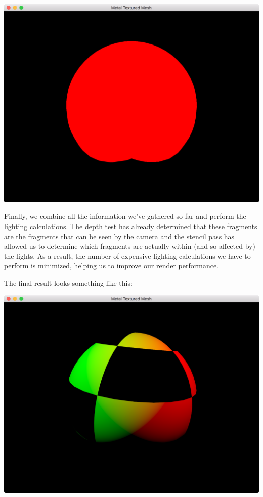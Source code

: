 \documentclass[11pt]{article}
\begin{document}
\begin{center}
\includegraphics[width=.9\linewidth]{../img/posts/implementing-deferred-shading-in-metal/stencil-buffer.png}
\end{center}

Finally, we combine all the information we've gathered so far and perform the
lighting calculations. The depth test has already determined that these
fragments are the fragments that can be seen by the camera and the stencil pass
has allowed us to determine which fragments are actually within (and so affected
by) the lights. As a result, the number of expensive lighting calculations we
have to perform is minimized, helping us to improve our render performance.

The final result looks something like this:


\begin{center}
\includegraphics[width=.9\linewidth]{../img/posts/implementing-deferred-shading-in-metal/final.png}
\end{center}
\end{document}
